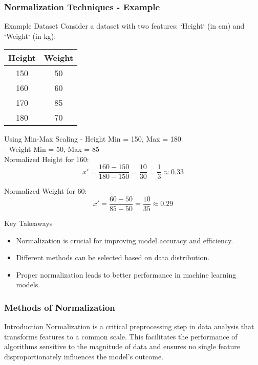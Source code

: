 \documentclass[aspectratio=169]{beamer}
\begin{document}
\begin{frame}[fragile]
    \frametitle{Normalization Techniques - Example}
    \begin{block}{Example Dataset}
        Consider a dataset with two features: `Height` (in cm) and `Weight` (in kg):
        \begin{center}
        \begin{tabular}{|c|c|}
            \hline
            Height & Weight \\
            \hline
            150 & 50 \\
            160 & 60 \\
            170 & 85 \\
            180 & 70 \\
            \hline
        \end{tabular}
        \end{center}
    \end{block}
    \begin{block}{Using Min-Max Scaling}
        - Height Min = 150, Max = 180\\
        - Weight Min = 50, Max = 85\\
        
        Normalized Height for 160:
        \begin{equation}
            x' = \frac{160 - 150}{180 - 150} = \frac{10}{30} = \frac{1}{3} \approx 0.33
        \end{equation}
        
        Normalized Weight for 60:
        \begin{equation}
            x' = \frac{60 - 50}{85 - 50} = \frac{10}{35} \approx 0.29
        \end{equation}
    \end{block}
    \begin{block}{Key Takeaways}
        \begin{itemize}
            \item Normalization is crucial for improving model accuracy and efficiency.
            \item Different methods can be selected based on data distribution.
            \item Proper normalization leads to better performance in machine learning models.
        \end{itemize}
    \end{block}
\end{frame}

\begin{frame}[fragile]
    \frametitle{Methods of Normalization}
    \begin{block}{Introduction}
        Normalization is a critical preprocessing step in data analysis that transforms features to a common scale. This facilitates the performance of algorithms sensitive to the magnitude of data and ensures no single feature disproportionately influences the model's outcome.
    \end{block}
\end{frame}
\end{document}
